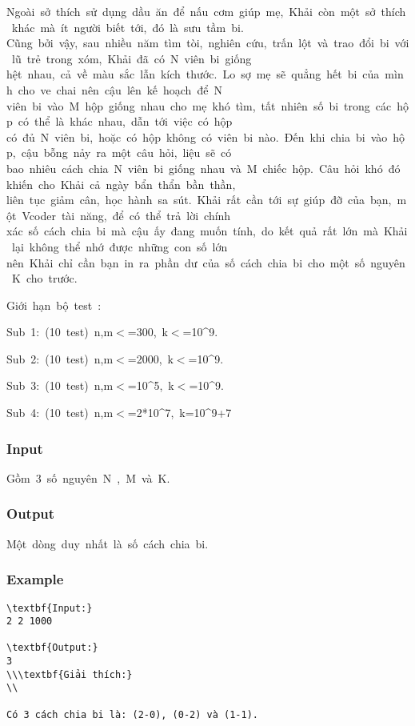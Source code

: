 



   Ngoài sở thích sử dụng dầu ăn để nấu cơm giúp mẹ, Khải còn một sở thích khác mà ít người biết tới, đó là sưu tầm bi. Cũng bởi vậy, sau nhiều năm tìm tòi, nghiên cứu, trấn lột và trao đổi bi với lũ trẻ trong xóm, Khải đã có N viên bi giống hệt nhau, cả về màu sắc lẫn kích thước. Lo sợ mẹ sẽ quẳng hết bi của mình cho ve chai nên cậu lên kế hoạch để N viên bi vào M hộp giống nhau cho mẹ khó tìm, tất nhiên số bi trong các hộp có thể là khác nhau, dẫn tới việc có hộp có đủ N viên bi, hoặc có hộp không có viên bi nào. Đến khi chia bi vào hộp, cậu bỗng nảy ra một câu hỏi, liệu sẽ có bao nhiêu cách chia N viên bi giống nhau và M chiếc hộp. Câu hỏi khó đó khiến cho Khải cả ngày bẩn thẩn bần thần, liên tục giảm cân, học hành sa sút. Khải rất cần tới sự giúp đỡ của bạn, một Vcoder tài năng, để có thể trả lời chính xác số cách chia bi mà cậu ấy đang muốn tính, do kết quả rất lớn mà Khải lại không thể nhớ được những con số lớn nên Khải chỉ cần bạn in ra phần dư của số cách chia bi cho một số nguyên K cho trước.  



   Giới hạn bộ test :  

   Sub 1: (10 test) n,m$<$=300, k$<$=10\textasciicircum9.  

   Sub 2: (10 test) n,m$<$=2000, k$<$=10\textasciicircum9.  

   Sub 3: (10 test) n,m$<$=10\textasciicircum5, k$<$=10\textasciicircum9.  

   Sub 4: (10 test) n,m$<$=2*10\textasciicircum7, k=10\textasciicircum9+7  



\subsubsection{   Input  }

   Gồm 3 số nguyên N , M và K.  

\subsubsection{   Output  }

   Một dòng duy nhất là số cách chia bi.  

\subsubsection{   Example  }
\begin{verbatim}
\textbf{Input:}
2 2 1000

\textbf{Output:}
3
\\\textbf{Giải thích:}
\\

Có 3 cách chia bi là: (2-0), (0-2) và (1-1).\end{verbatim}